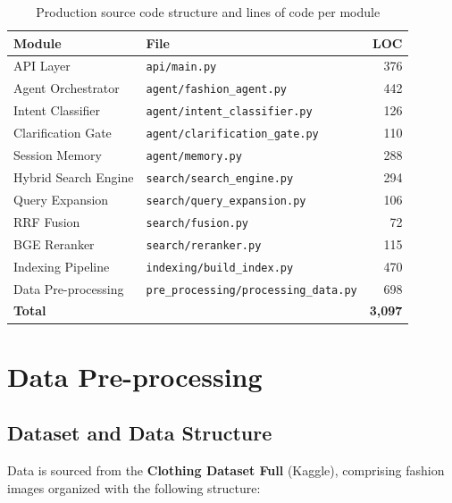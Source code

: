\documentclass[12pt, twoside]{report}
\begin{document}
\begin{table}[H]
\centering
\begin{tabular}{llr}
\toprule
\textbf{Module} & \textbf{File} & \textbf{LOC}\\
\midrule
API Layer              & \texttt{api/main.py}                          & 376\\
Agent Orchestrator     & \texttt{agent/fashion\_agent.py}              & 442\\
Intent Classifier      & \texttt{agent/intent\_classifier.py}          & 126\\
Clarification Gate     & \texttt{agent/clarification\_gate.py}         & 110\\
Session Memory         & \texttt{agent/memory.py}                      & 288\\
Hybrid Search Engine   & \texttt{search/search\_engine.py}             & 294\\
Query Expansion        & \texttt{search/query\_expansion.py}           & 106\\
RRF Fusion             & \texttt{search/fusion.py}                     & 72\\
BGE Reranker           & \texttt{search/reranker.py}                   & 115\\
Indexing Pipeline      & \texttt{indexing/build\_index.py}             & 470\\
Data Pre-processing    & \texttt{pre\_processing/processing\_data.py}  & 698\\
\midrule
\textbf{Total}         &                                               & \textbf{3,097}\\
\bottomrule
\end{tabular}
\caption{Production source code structure and lines of code per module}
\end{table}

\chapter{Data Pre-processing}

\section{Dataset and Data Structure}
Data is sourced from the \textbf{Clothing Dataset Full} (Kaggle), comprising fashion images organized with the following structure:
\end{document}
